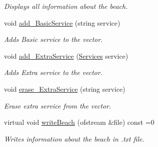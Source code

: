 \begin{DoxyCompactItemize}
\begin{DoxyCompactList}\small\item\em Displays all information about the beach. \end{DoxyCompactList}\item 
void \hyperlink{class_beach_a242686b20a85f0efa8b19eafdb53d0a7}{add\+\_\+\+Basic\+Service} (string service)
\begin{DoxyCompactList}\small\item\em Adds Basic service to the vector. \end{DoxyCompactList}\item 
void \hyperlink{class_beach_a9182c63f32af1afd95649f14077c820c}{add\+\_\+\+Extra\+Service} (\hyperlink{class_services}{Services} service)
\begin{DoxyCompactList}\small\item\em Adds Extra service to the vector. \end{DoxyCompactList}\item 
void \hyperlink{class_beach_aa22b4abddf590bef4ff426f28866aca0}{erase\+\_\+\+Extra\+Service} (string service)
\begin{DoxyCompactList}\small\item\em Erase extra service from the vector. \end{DoxyCompactList}\item 
virtual void \hyperlink{class_beach_a2ba3bf80382fa1b5e00befe0c4ccde88}{write\+Beach} (ofstream \&file) const =0
\begin{DoxyCompactList}\small\item\em Writes information about the beach in .txt file. \end{DoxyCompactList}\end{DoxyCompactItemize}
